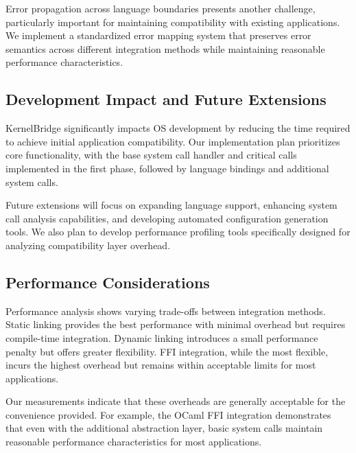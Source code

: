 \documentclass[conference]{IEEEtran}
\begin{document}
Error propagation across language boundaries presents another challenge, particularly important for maintaining compatibility with existing applications. We implement a standardized error mapping system that preserves error semantics across different integration methods while maintaining reasonable performance characteristics.

\subsection{Development Impact and Future Extensions}
KernelBridge significantly impacts OS development by reducing the time required to achieve initial application compatibility. Our implementation plan prioritizes core functionality, with the base system call handler and critical calls implemented in the first phase, followed by language bindings and additional system calls.

Future extensions will focus on expanding language support, enhancing system call analysis capabilities, and developing automated configuration generation tools. We also plan to develop performance profiling tools specifically designed for analyzing compatibility layer overhead.

\subsection{Performance Considerations}
Performance analysis shows varying trade-offs between integration methods. Static linking provides the best performance with minimal overhead but requires compile-time integration. Dynamic linking introduces a small performance penalty but offers greater flexibility. FFI integration, while the most flexible, incurs the highest overhead but remains within acceptable limits for most applications.

Our measurements indicate that these overheads are generally acceptable for the convenience provided. For example, the OCaml FFI integration demonstrates that even with the additional abstraction layer, basic system calls maintain reasonable performance characteristics for most applications.



\end{document}
